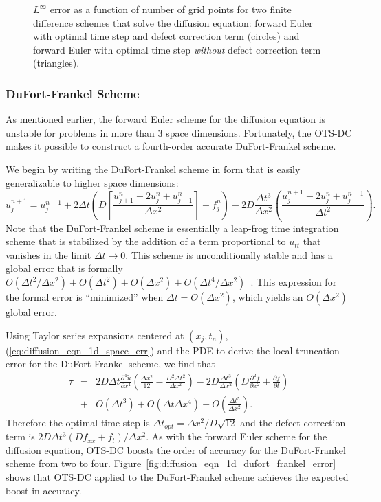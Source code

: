 \documentclass[fleqn,12pt,twoside]{article}
\newcommand{\beq}{\begin{equation}}
\newcommand{\eeq}{\end{equation}}
\newcommand{\bea}{\begin{eqnarray}}
\newcommand{\eea}{\end{eqnarray}}
\def\pt{\partial t}
\def\px{\partial x}
\def\tu{\tilde{u}}
\def\dt{\Delta t}
\def\dx{\Delta x}
\def\dto{\dt_{opt}}
\begin{document}
\begin{figure}[tb]
\begin{center}
\caption{$L^\infty$ error as a function of number of grid points for 
two finite difference schemes that solve the diffusion equation: 
forward Euler with optimal time step and defect correction term (circles) and 
forward Euler with optimal time step \emph{without} defect correction term 
(triangles).  
}
\label{fig:diffusion_eqn_1d_src_error}
\end{center}
\end{figure}


\subsubsection{DuFort-Frankel Scheme \label{sec:dufort_frankel}}
As mentioned earlier, the forward Euler scheme for the diffusion equation is
unstable for problems in more than 3 space dimensions.  Fortunately, the 
OTS-DC makes it possible to construct a fourth-order accurate 
DuFort-Frankel scheme. 

We begin by writing the DuFort-Frankel scheme in form that is easily 
generalizable to higher space dimensions:
\beq
  u^{n+1}_j = u^{n-1}_j 
  + 2 \dt 
    \left( D \left[\frac{u^{n}_{j+1} -2 u^{n}_j + u^{n}_{j-1}}{\dx^2}\right] 
         + f^n_j \right)
  - 2 D \frac{\dt^3}{\dx^2}
    \left( \frac{u^{n+1}_j -2 u^{n}_j + u^{n-1}_j}{\dt^2}\right).
  \label{eq:diffusion_eqn_1d_DF_scheme}
\eeq
Note that the DuFort-Frankel scheme is essentially a leap-frog time integration 
scheme that is stabilized by the addition of a term proportional to $u_{tt}$
that vanishes in the limit $\dt \rightarrow 0$.  This scheme is 
unconditionally stable and has a global error that is formally 
$O(\dt^2/\dx^2) + O(\dt^2) + O(\dx^2) + O(\dt^4/\dx^2)$~\cite{gko_book}.  
This expression for the formal error is ``minimized'' when $\dt = O(\dx^2)$, 
which yields an $O(\dx^2)$ global error.

Using Taylor series expansions centered at $(x_j, t_n)$, 
(\ref{eq:diffusion_eqn_1d_space_err}) and the PDE to derive the local 
truncation error for the DuFort-Frankel scheme, we find that 
\bea
  \tau &=& 2D \dt \frac{\partial^4 \tu}{\px^4}
  \left(\frac{\dx^2}{12} - \frac{D^2 \dt^2}{\dx^2} \right)
  - 2 D \frac{\dt^3}{\dx^2} \left(D \frac{\partial^2 f}{\px^2}  
                                 + \frac{\partial f}{\pt} \right)
  \nonumber \\
  &+& O(\dt^3) + O(\dt \dx^4) + O\left(\frac{\dt^5}{\dx^2} \right).
\eea
Therefore the optimal time step is $\dto = \dx^2/D\sqrt{12}$ and the defect
correction term is $2 D \dt^3 \left(D f_{xx} + f_{t} \right)/\dx^2$.  As with 
the forward Euler scheme for the diffusion equation, OTS-DC boosts the
order of accuracy for the DuFort-Frankel scheme from two to four.  
Figure~\ref{fig:diffusion_eqn_1d_dufort_frankel_error} shows that OTS-DC
applied to the DuFort-Frankel scheme achieves the expected boost in accuracy. 
\end{document}
